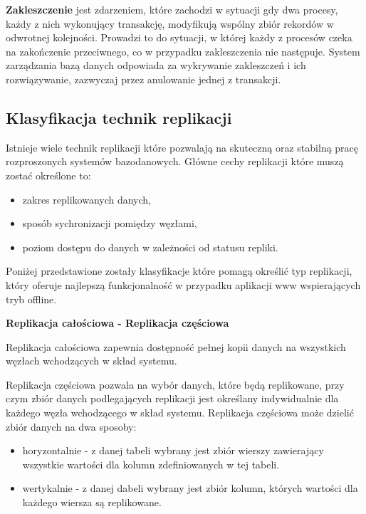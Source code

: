 \textbf{Zakleszczenie} jest zdarzeniem, które zachodzi w sytuacji gdy dwa procesy, każdy z nich wykonujący transakcję, modyfikują wspólny zbiór rekordów w odwrotnej kolejności. Prowadzi to do sytuacji, w której każdy z procesów czeka na zakończenie przeciwnego, co w przypadku zakleszczenia nie następuje. System zarządzania bazą danych odpowiada za wykrywanie zakleszczeń i ich rozwiązywanie, zazwyczaj przez anulowanie jednej z transakcji.

\subsection{Klasyfikacja technik replikacji}
\label{sec:klasTechReplik}

Istnieje wiele technik replikacji które pozwalają na skuteczną oraz stabilną pracę rozproszonych systemów bazodanowych. Główne cechy replikacji które muszą zostać określone to:

\begin{itemize}
\item zakres replikowanych danych,
\item sposób sychronizacji pomiędzy węzłami,
\item poziom dostępu do danych w zależności od statusu repliki.
\end{itemize}

Poniżej przedstawione zostały klasyfikacje które pomagą określić typ replikacji, który oferuje najlepszą funkcjonalność w przypadku aplikacji www wspierających tryb offline.

\setlength{\parskip}{10pt plus 1pt minus 1pt}
\textbf{Replikacja całościowa - Replikacja częściowa}
\setlength{\parskip}{10pt plus 1pt minus 1pt}

Replikacja całościowa zapewnia dostępność pełnej kopii danych na wszystkich węzłach wchodzących w skład systemu.

Replikacja częściowa pozwala na wybór danych, które będą replikowane, przy czym zbiór danych podlegających replikacji jest określany indywidualnie dla każdego węzła wchodzącego w skład systemu. Replikacja częściowa może dzielić zbiór danych na dwa sposoby:

\begin{itemize}
\item horyzontalnie - z danej tabeli wybrany jest zbiór wierszy zawierający wszystkie wartości dla kolumn zdefiniowanych w tej tabeli.
\item wertykalnie - z danej dabeli wybrany jest zbiór kolumn, których wartości dla każdego wiersza są replikowane.
\end{itemize}

